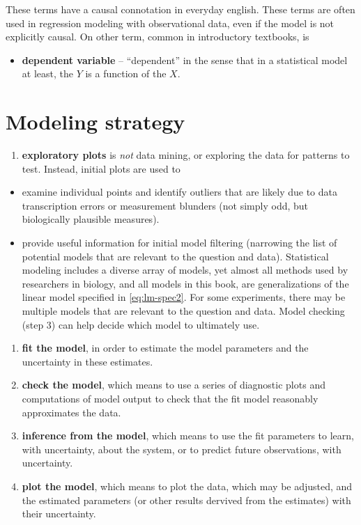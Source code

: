 \documentclass[]{book}
\providecommand{\tightlist}{%
  \setlength{\itemsep}{0pt}\setlength{\parskip}{0pt}}
\begin{document}
These terms have a causal connotation in everyday english. These terms are often used in regression modeling with observational data, even if the model is not explicitly causal. On other term, common in introductory textbooks, is

\begin{itemize}
\tightlist
\item
  \textbf{dependent variable} -- ``dependent'' in the sense that in a statistical model at least, the \(Y\) is a function of the \(X\).
\end{itemize}

\hypertarget{modeling-strategy}{%
\section{Modeling strategy}\label{modeling-strategy}}

\begin{enumerate}
\def\labelenumi{\arabic{enumi}.}
\tightlist
\item
  \textbf{exploratory plots} is \emph{not} data mining, or exploring the data for patterns to test. Instead, initial plots are used to
\end{enumerate}

\begin{itemize}
\tightlist
\item
  examine individual points and identify outliers that are likely due to data transcription errors or measurement blunders (not simply odd, but biologically plausible measures).
\item
  provide useful information for initial model filtering (narrowing the list of potential models that are relevant to the question and data). Statistical modeling includes a diverse array of models, yet almost all methods used by researchers in biology, and all models in this book, are generalizations of the linear model specified in \eqref{eq:lm-spec2}. For some experiments, there may be multiple models that are relevant to the question and data. Model checking (step 3) can help decide which model to ultimately use.
\end{itemize}

\begin{enumerate}
\def\labelenumi{\arabic{enumi}.}
\setcounter{enumi}{1}
\tightlist
\item
  \textbf{fit the model}, in order to estimate the model parameters and the uncertainty in these estimates.
\item
  \textbf{check the model}, which means to use a series of diagnostic plots and computations of model output to check that the fit model reasonably approximates the data.
\item
  \textbf{inference from the model}, which means to use the fit parameters to learn, with uncertainty, about the system, or to predict future observations, with uncertainty.
\item
  \textbf{plot the model}, which means to plot the data, which may be adjusted, and the estimated parameters (or other results dervived from the estimates) with their uncertainty.
\end{enumerate}
\end{document}
